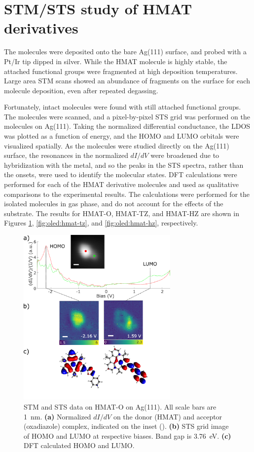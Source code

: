 \section{{STM}/{STS} study of HMAT derivatives}

The molecules were deposited onto the bare Ag(111) surface, and probed with a Pt/Ir tip dipped in silver. While the \ac{HMAT} molecule is highly stable, the attached functional groups were fragmented at high deposition temperatures. Large area \ac{STM} scans showed an abundance of fragments on the surface for each molecule deposition, even after repeated degassing.

Fortunately, intact molecules were found with still attached functional groups. The molecules were scanned, and a pixel-by-pixel \ac{STS} grid was performed on the molecules on Ag(111). Taking the normalized differential conductance, the \ac{LDOS} was plotted as a function of energy, and the \ac{HOMO} and \ac{LUMO} orbitals were visualized spatially. As the molecules were studied directly on the Ag(111) surface, the resonances in the normalized $dI/dV$ were broadened due to hybridization with the metal, and so the peaks in the \ac{STS} spectra, rather than the onsets, were used to identify the molecular states. \ac{DFT} calculations were performed for each of the \ac{HMAT} derivative molecules and used as qualitative comparisons to the experimental results. The calculations were performed for the isolated molecules in gas phase, and do not account for the effects of the substrate.  The results for HMAT-O, HMAT-TZ, and HMAT-HZ are shown in Figures \ref{fig:oled:hmat-o}, \ref{fig:oled:hmat-tz}, and \ref{fig:oled:hmat-hz}, respectively. 

\begin{figure} [H]
    \centering
    \includegraphics[width=0.7\textwidth]{pictures/HMATO_diagram.png}
    \caption{ STM and STS data on HMAT-O on Ag(111). All scale bars are \SI{1}{nm}. \textbf{(a)} Normalized $dI/dV$ on the donor (HMAT) and acceptor (oxadiazole) complex, indicated on the inset (). \textbf{(b)} STS grid image of HOMO and LUMO at respective biases. Band gap is \SI{3.76}{eV}. \textbf{(c)} DFT calculated HOMO and LUMO. } %
    \label{fig:oled:hmat-o}
\end{figure}

